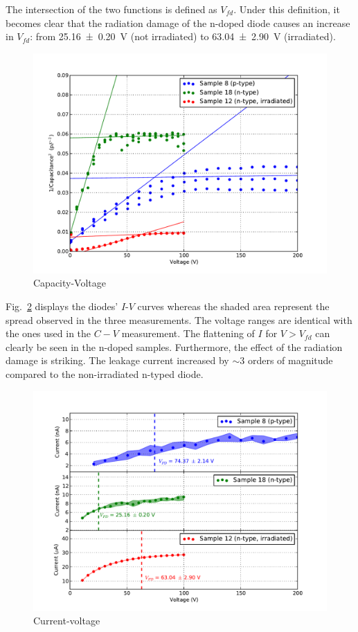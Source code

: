 \documentclass[11pt]{article}
\begin{document}
 The intersection of the two functions is defined as $V_{fd}$.
Under this definition, it becomes clear that the radiation damage of the n-doped diode causes an increase in $V_{fd}$: from \SI{25.16\pm0.20}{V} (not irradiated) to \SI{63.04\pm2.90}{V} (irradiated).
\label{sec:results}
\begin{figure}
  \centering
  \includegraphics[width=\textwidth]{./figures/cv.pdf}  
  \caption{Capacity-Voltage }
  \label{fig:cv}
\end{figure}

Fig.~\ref{fig:iv} displays the diodes' $I$-$V$ curves whereas the shaded area represent the spread observed in the three measurements.
The voltage ranges are identical with the ones used in the $C-V$ measurement.
The flattening of $I$ for $V>V_{fd}$ can clearly be seen in the n-doped samples.
Furthermore, the effect of the radiation damage is striking.
The leakage current increased by $\sim 3$ orders of magnitude compared to the non-irradiated n-typed diode.

\begin{figure}
  \centering
  \includegraphics[width=\textwidth]{./figures/iv.pdf}
  \caption{Current-voltage}
  \label{fig:iv}
\end{figure}
\end{document}

